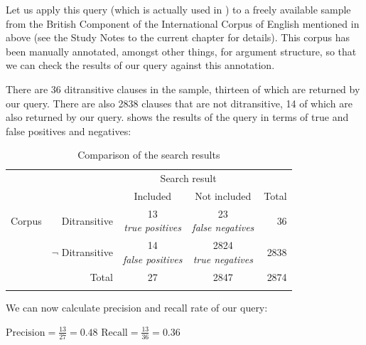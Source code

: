 Let us apply this query  (which is actually used in \citealt{colleman_constructional_2011}) to a freely available sample from the British Component of the International Corpus of English mentioned in  above (see the Study Notes to the current chapter for details). This corpus has been manually annotated,  amongst other things, for argument structure, so that we can check the results of our query  against this  annotation.

There are 36 ditransitive  clauses in the sample, thirteen of which are returned by our query.  There are also 2838 clauses that are not ditransitive, 14 of which are also returned by our query.  shows the results of the query in terms of true and false positives and negatives:

\begin{table}
\caption{Comparison of the search results}
\label{tab:queryoutcomesexample}
\begin{tabular}[t]{lrccr}
\lsptoprule
 & & \multicolumn{2}{c}{Search result} & \\
 & & Included & Not included & Total \\
\midrule
Corpus & Ditransitive & \makecell[t]{13 \\ \footnotesize{\textit{true positives}}} & \makecell[t]{23 \\ \footnotesize{\textit{false negatives}}} & 36 \\
 & $\lnot$ Ditransitive & \makecell[t]{14 \\ \footnotesize{\textit{false positives}}} & \makecell[t]{2824 \\ \footnotesize{\textit{true negatives}}} & 2838 \\
\midrule
 & Total & 27 & 2847 & 2874 \\
\lspbottomrule
\end{tabular}
\end{table}

We can now calculate precision  and recall  rate of our  query:

\begin{exe}
\ex
\begin{xlist}
\label{ex:precisionrecallrate}
\ex $\text{Precision} = \frac{13}{27} = 0.48$
\ex $\text{Recall} = \frac{13}{36} = 0.36$
\end{xlist}
\end{exe}

